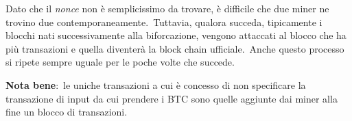 Dato che il \textit{nonce} non è semplicissimo da trovare, è difficile che due miner ne trovino due contemporaneamente.\
Tuttavia, qualora succeda, tipicamente i blocchi nati successivamente alla biforcazione, vengono attaccati al blocco che ha più transazioni e quella diventerà la block chain ufficiale.\
Anche questo processo si ripete sempre uguale per le poche volte che succede.\

\textbf{Nota bene}:\ le uniche transazioni a cui è concesso di non specificare la transazione di input da cui prendere i BTC sono quelle aggiunte dai miner alla fine un blocco di transazioni.\
